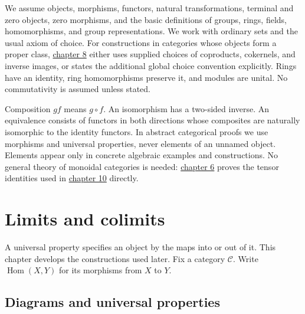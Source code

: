\documentclass[11pt,a4paper]{article}
\theoremstyle{plain}
\theoremstyle{definition}
\begin{document}
We assume objects, morphisms, functors, natural transformations, terminal and zero objects, zero morphisms, and the basic definitions of groups, rings, fields, homomorphisms, and group representations. We work with ordinary sets and the usual axiom of choice. For constructions in categories whose objects form a proper class, \hyperref[chapter-08]{chapter 8} either uses supplied choices of coproducts, cokernels, and inverse images, or states the additional global choice convention explicitly. Rings have an identity, ring homomorphisms preserve it, and modules are unital. No commutativity is assumed unless stated.

 
Composition \(gf\) means \(g\circ f\). An isomorphism has a two-sided inverse. An equivalence consists of functors in both directions whose composites are naturally isomorphic to the identity functors. In abstract categorical proofs we use morphisms and universal properties, never elements of an unnamed object. Elements appear only in concrete algebraic examples and constructions. No general theory of monoidal categories is needed: \hyperref[chapter-06]{chapter 6} proves the tensor identities used in \hyperref[chapter-10]{chapter 10} directly.

 
\section{Limits and colimits}
\label{chapter-02}
 
A universal property specifies an object by the maps into or out of it. This chapter develops the constructions used later. Fix a category \(\mathcal C\). Write \(\operatorname{Hom}(X,Y)\) for its morphisms from \(X\) to \(Y\).


\subsection{Diagrams and universal properties}
\end{document}
